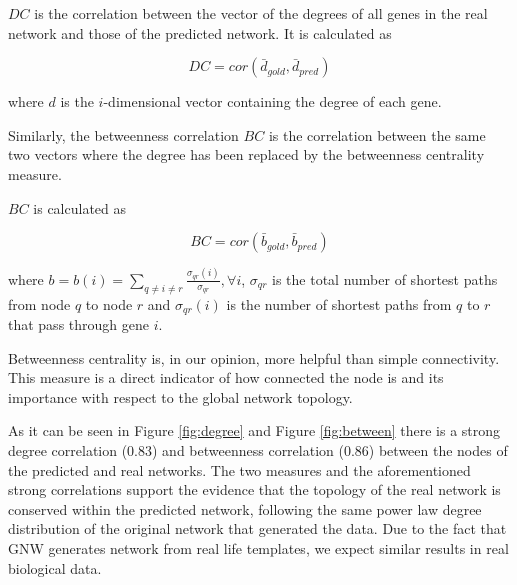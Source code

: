 $DC$ is the correlation between the vector of the degrees of all genes in the real network and those of the predicted network. It is calculated as 

\begin{equation}
DC = cor(\bar{d}_{gold}, \bar{d}_{pred})
\label{eq:degree}
\end{equation}

where $d$ is the $i$-dimensional vector containing the degree of each gene. 

Similarly, the betweenness correlation $BC$ is the correlation between the same two vectors where the degree has been replaced by the betweenness centrality measure.

$BC$ is calculated as 

\begin{equation}
BC = cor(\bar{b}_{gold}, \bar{b}_{pred}) 
\label{eq:betweenness}
\end{equation}


where $b=b(i)=\sum_{q \ne i \ne r} \frac{\sigma_{qr}(i) } {\sigma_{qr} } , \forall i$, $\sigma_{qr}$ is the total number of shortest paths from node $q$ to node $r$ and $\sigma_{qr}(i)$ is the number of shortest paths from $q$ to $r$ that pass through gene $i$.


Betweenness centrality is, in our opinion, more helpful than simple connectivity. This measure is a direct indicator of how connected the node is and its importance with respect to the global network topology. 

As it can be seen in Figure \ref{fig:degree} and Figure \ref{fig:between} there is a strong degree correlation (0.83) and betweenness correlation (0.86) between the nodes of the predicted and real networks. The two measures and the aforementioned strong correlations support the evidence that the topology of the real network is conserved within the predicted network, following the same power law degree distribution of the original network that generated the data. 
Due to the fact that GNW generates network from real life templates, we expect  similar results in real biological data.


